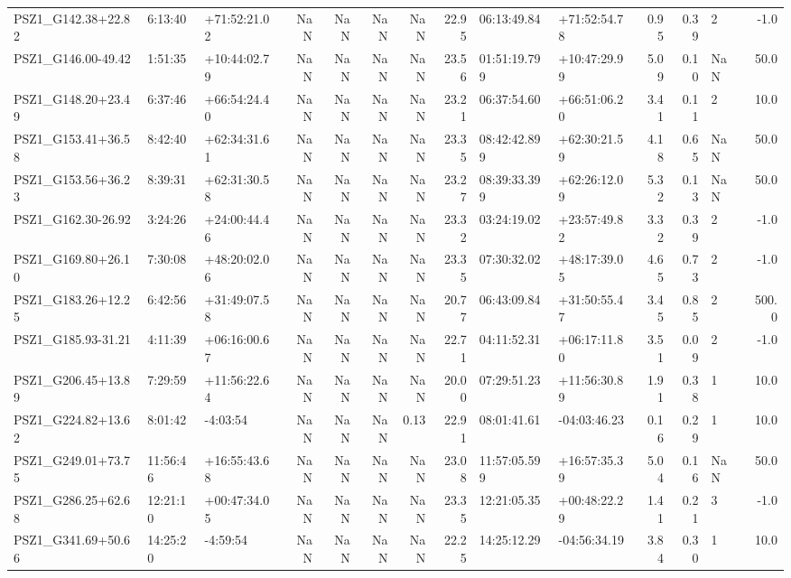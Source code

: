 \documentclass[apj, revtex4]{emulateapj}
\begin{document}
\begin{table}
\begin{tabular}{lllrrrrrllrrlr}
 PSZ1\_G142.38+22.82 &   6:13:40 &  +71:52:21.02 & NaN &  NaN &   NaN &  NaN &    22.95 &   06:13:49.84 &  +71:52:54.78 &     0.95 &  0.39 &    2 &  -1.0 \\
 PSZ1\_G146.00-49.42 &   1:51:35 &  +10:44:02.79 & NaN &  NaN &   NaN &  NaN &    23.56 &  01:51:19.799 &  +10:47:29.99 &     5.09 &  0.10 &  NaN &  50.0 \\
 PSZ1\_G148.20+23.49 &   6:37:46 &  +66:54:24.40 & NaN &  NaN &   NaN &  NaN &    23.21 &   06:37:54.60 &  +66:51:06.20 &     3.41 &  0.11 &    2 &  10.0 \\
 PSZ1\_G153.41+36.58 &   8:42:40 &  +62:34:31.61 & NaN &  NaN &   NaN &  NaN &    23.35 &  08:42:42.899 &  +62:30:21.59 &     4.18 &  0.65 &  NaN &  50.0 \\
 PSZ1\_G153.56+36.23 &   8:39:31 &  +62:31:30.58 & NaN &  NaN &   NaN &  NaN &    23.27 &  08:39:33.399 &  +62:26:12.09 &     5.32 &  0.13 &  NaN &  50.0 \\
 PSZ1\_G162.30-26.92 &   3:24:26 &  +24:00:44.46 & NaN &  NaN &   NaN &  NaN &    23.32 &   03:24:19.02 &  +23:57:49.82 &     3.32 &  0.39 &    2 &  -1.0 \\
 PSZ1\_G169.80+26.10 &   7:30:08 &  +48:20:02.06 & NaN &  NaN &   NaN &  NaN &    23.35 &   07:30:32.02 &  +48:17:39.05 &     4.65 &  0.73 &    2 &  -1.0 \\
 PSZ1\_G183.26+12.25 &   6:42:56 &  +31:49:07.58 & NaN &  NaN &   NaN &  NaN &    20.77 &   06:43:09.84 &  +31:50:55.47 &     3.45 &  0.85 &    2 & 500.0 \\
 PSZ1\_G185.93-31.21 &   4:11:39 &  +06:16:00.67 & NaN &  NaN &   NaN &  NaN &    22.71 &   04:11:52.31 &  +06:17:11.80 &     3.51 &  0.09 &    2 &  -1.0 \\
 PSZ1\_G206.45+13.89 &   7:29:59 &  +11:56:22.64 & NaN &  NaN &   NaN &  NaN &    20.00 &   07:29:51.23 &  +11:56:30.89 &     1.91 &  0.38 &    1 &  10.0 \\
 PSZ1\_G224.82+13.62 &   8:01:42 &      -4:03:54 & NaN &  NaN &   NaN & 0.13 &    22.91 &   08:01:41.61 &  -04:03:46.23 &     0.16 &  0.29 &    1 &  10.0 \\
 PSZ1\_G249.01+73.75 &  11:56:46 &  +16:55:43.68 & NaN &  NaN &   NaN &  NaN &    23.08 &  11:57:05.599 &  +16:57:35.39 &     5.04 &  0.16 &  NaN &  50.0 \\
 PSZ1\_G286.25+62.68 &  12:21:10 &  +00:47:34.05 & NaN &  NaN &   NaN &  NaN &    23.35 &   12:21:05.35 &  +00:48:22.29 &     1.41 &  0.21 &    3 &  -1.0 \\
 PSZ1\_G341.69+50.66 &  14:25:20 &      -4:59:54 & NaN &  NaN &   NaN &  NaN &    22.25 &   14:25:12.29 &  -04:56:34.19 &     3.84 &  0.30 &    1 &  10.0 \\

\end{tabular}
\end{table}
\end{document}
